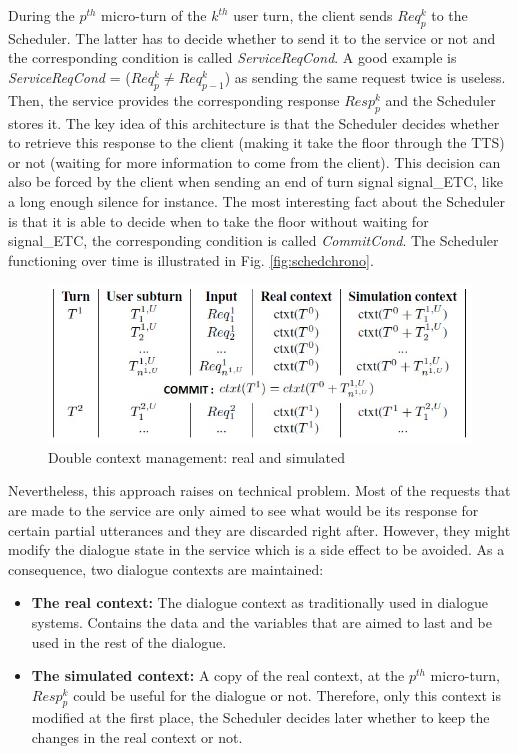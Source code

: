     	During the $p^{th}$ micro-turn of the $k^{th}$ user turn, the client sends $Req^k_p$ to the Scheduler. The latter has to decide whether to send it to the service or not and the corresponding condition is called \textit{ServiceReqCond}. A good example is \textit{ServiceReqCond} = ($Req^k_p \neq Req^k_{p-1}$) as sending the same request twice is useless. Then, the service provides the corresponding response $Resp^k_p$ and the Scheduler stores it. The key idea of this architecture is that the Scheduler decides whether to retrieve this response to the client (making it take the floor through the TTS) or not (waiting for more information to come from the client). This decision can also be forced by the client when sending an end of turn signal signal\_ETC, like a long enough silence for instance. The most interesting fact about the Scheduler is that it is able to decide when to take the floor without waiting for signal\_ETC, the corresponding condition is called \textit{CommitCond}. The Scheduler functioning over time is illustrated in Fig. \ref{fig:schedchrono}.
        
        \begin{figure}[ht]
          \centering
          \includegraphics[scale=0.8]{figures/ContextChrono.jpg}
          \caption{Double context management: real and simulated}
          \label{fig:contextchrono}
        \end{figure}
        
        Nevertheless, this approach raises on technical problem. Most of the requests that are made to the service are only aimed to see what would be its response for certain partial utterances and they are discarded right after. However, they might modify the dialogue state in the service which is a side effect to be avoided. As a consequence, two dialogue contexts are maintained:
        
        \begin{itemize}
           	\item \textbf{The real context:} The dialogue context as traditionally used in dialogue systems. Contains the data and the variables that are aimed to last and be used in the rest of the dialogue.
        	\item \textbf{The simulated context:} A copy of the real context, at the $p^{th}$ micro-turn, $Resp^k_p$ could be useful for the dialogue or not. Therefore, only this context is modified at the first place, the Scheduler decides later whether to keep the changes in the real context or not.
        \end{itemize}
        
